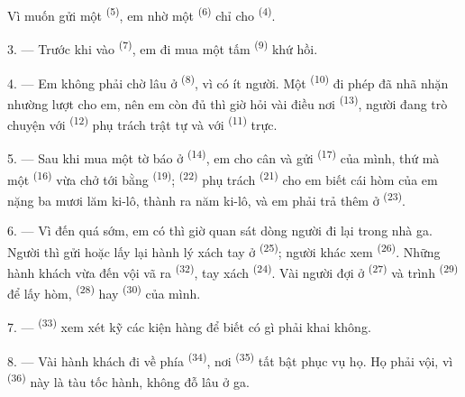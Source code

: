 Vì muốn gửi một  \textsuperscript{(5)}, em nhờ một
 \textsuperscript{(6)} chỉ cho 
\textsuperscript{(4)}.

3. --- Trước khi vào  \textsuperscript{(7)}, em đi mua một tấm
 \textsuperscript{(9)} khứ hồi.

4. --- Em không phải chờ lâu ở  \textsuperscript{(8)}, vì có ít người.
Một  \textsuperscript{(10)} đi phép đã nhã nhặn nhường lượt cho em,
nên em còn đủ thì giờ hỏi vài điều nơi  \textsuperscript{(13)}, người
đang trò chuyện với  \textsuperscript{(12)} phụ trách trật tự và
với  \textsuperscript{(11)} trực.

\VUsaut{3.0mm}

5. --- Sau khi mua một tờ báo ở  \textsuperscript{(14)}, em cho
cân và gửi  \textsuperscript{(17)} của mình, thứ mà một  \textsuperscript{(16)} vừa chở tới bằng 
\textsuperscript{(19)};  \textsuperscript{(22)} phụ trách
 \textsuperscript{(21)} cho em biết cái hòm của em nặng ba mươi lăm ki-lô,
thành ra  năm ki-lô, và em phải trả thêm ở 
\textsuperscript{(23)}.

6. --- Vì đến quá sớm, em có thì giờ quan sát dòng người đi lại trong nhà ga. Người thì
gửi hoặc lấy lại hành lý xách tay ở  \textsuperscript{(25)}; người
khác xem  \textsuperscript{(26)}. Những hành khách vừa đến vội vã ra
 \textsuperscript{(32)}, tay xách  \textsuperscript{(24)}.
Vài người đợi ở  \textsuperscript{(27)} và trình 
\textsuperscript{(29)} để lấy hòm,  \textsuperscript{(28)} hay 
\textsuperscript{(30)} của mình.

7. ---  \textsuperscript{(33)} xem xét kỹ các kiện hàng để
biết có gì phải khai không.

8. --- Vài hành khách đi về phía  \textsuperscript{(34)}, nơi
 \textsuperscript{(35)} tất bật phục vụ họ. Họ phải vội, vì
 \textsuperscript{(36)} này là tàu tốc hành, không đỗ lâu ở ga.

